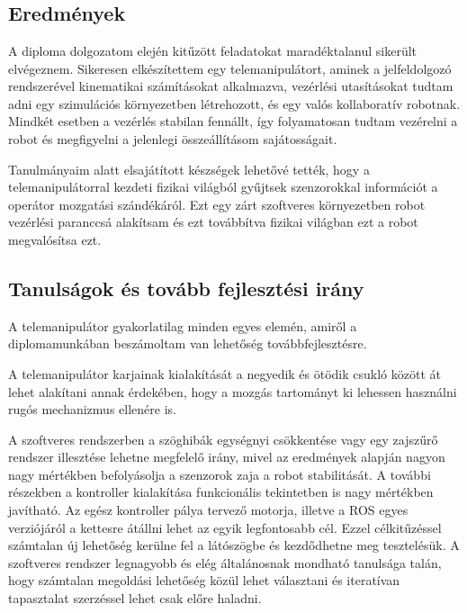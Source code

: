 \chapter{\osszefoglalas}

\section{Eredmények}

A diploma dolgozatom elején kitűzött feladatokat maradéktalanul sikerült elvégeznem. Sikeresen elkészítettem egy telemanipulátort, aminek a jelfeldolgozó rendszerével kinematikai számításokat alkalmazva, vezérlési utasításokat tudtam adni egy szimulációs környezetben létrehozott, és egy valós kollaboratív robotnak. Mindkét esetben a vezérlés stabilan fennállt, így folyamatosan tudtam vezérelni a robot és megfigyelni a jelenlegi összeállításom sajátosságait.

Tanulmányaim alatt elsajátított készségek lehetővé tették, hogy a telemanipulátorral kezdeti fizikai világból gyűjtsek szenzorokkal információt a operátor mozgatási szándékáról. Ezt egy zárt szoftveres környezetben robot vezérlési paranccsá alakítsam és ezt továbbítva fizikai világban ezt a robot megvalósítsa ezt.


\section{Tanulságok és tovább fejlesztési irány} 

A telemanipulátor gyakorlatilag minden egyes elemén, amiről a diplomamunkában beszámoltam van lehetőség továbbfejlesztésre.

A telemanipulátor karjainak kialakítását a negyedik és ötödik csukló között át lehet alakítani annak érdekében, hogy a mozgás tartományt ki lehessen használni rugós mechanizmus ellenére is.

A szoftveres rendszerben a szöghibák egységnyi csökkentése vagy egy zajszűrő rendszer illesztése lehetne megfelelő irány, mivel az eredmények alapján nagyon nagy mértékben befolyásolja a szenzorok zaja a robot stabilitását. A további részekben a kontroller kialakítása funkcionális tekintetben is nagy mértékben javítható. Az egész kontroller pálya tervező motorja, illetve a ROS egyes verziójáról a kettesre átállni lehet az egyik legfontosabb cél. Ezzel célkitűzéssel  számtalan új lehetőség kerülne fel a látószögbe és kezdődhetne meg tesztelésük. A szoftveres rendszer legnagyobb és elég általánosnak mondható tanulsága talán, hogy számtalan megoldási lehetőség közül lehet választani és iteratívan tapasztalat szerzéssel lehet csak előre haladni.

